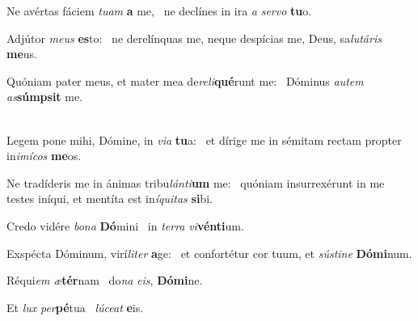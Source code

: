 \item Ne avértas fáciem \textit{tu}\textit{am} \textbf{a} me,~\psstar{} ne declínes in ira \textit{a} \textit{ser}\textit{vo} \textbf{tu}o.

\item Adjútor \textit{me}\textit{us} \textbf{es}to:~\psstar{} ne derelínquas me, neque despícias me, Deus, sa\textit{lu}\textit{tá}\textit{ris} \textbf{me}us.

\item Quóniam pater meus, et mater mea de\textit{re}\textit{li}\textbf{qué}runt me:~\psstar{} Dóminus \textit{au}\textit{tem} \textit{as}\textbf{súmp}\textbf{sit} me.\\~

\item Legem pone mihi, Dómine, in \textit{vi}\textit{a} \textbf{tu}a:~\psstar{} et dírige me in sémitam rectam propter in\textit{i}\textit{mí}\textit{cos} \textbf{me}os.

\item Ne tradíderis me in ánimas tribu\textit{lán}\textit{ti}\textbf{um} me:~\psstar{} quóniam insurrexérunt in me testes iníqui, et mentíta est in\textit{í}\textit{qui}\textit{tas} \textbf{si}bi.

\item Credo vidére \textit{bo}\textit{na} \textbf{Dó}mini~\psstar{} in \textit{ter}\textit{ra} \textit{vi}\textbf{vén}\textbf{ti}um.

\item Exspécta Dóminum, virí\textit{li}\textit{ter} \textbf{a}ge:~\psstar{} et confortétur cor tuum, et \textit{sús}\textit{ti}\textit{ne} \textbf{Dó}\textbf{mi}num.

\item Réqui\textit{em} \textit{æ}\textbf{tér}nam~\psstar{} do\textit{na} \textit{e}\textit{is}, \textbf{Dó}\textbf{mi}ne.

\item Et \textit{lux} \textit{per}\textbf{pé}tua~\psstar{} \textit{lú}\textit{ce}\textit{at} \textbf{e}is.